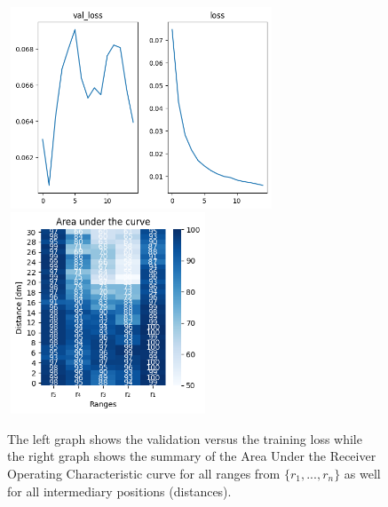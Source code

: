\begin{multicols}{2}
\end{multicols}\begin{figure}[H]%
\centering
\includegraphics[width=8cm,height=6cm]{3_models/models_19/graph_19.png}
\hspace{0.2 cm}
\includegraphics[width=6cm,height=6cm]{4_plots/plots_19/AUC_19.png}
\caption{The left graph shows the validation versus the training loss while the right graph shows the summary of the Area Under the Receiver Operating Characteristic curve for all ranges from $\{r_{1}, ... ,r_{n}\}$ as well for all intermediary positions (distances).}
\label{auc_19}
\end{figure}



\newpage
